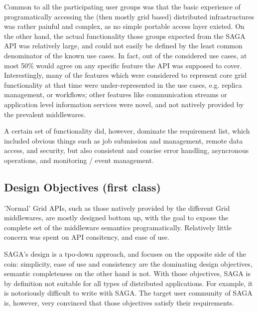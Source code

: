   Common to all the participating user groups was that the basic
  experience of programatically accessing the (then mostly grid based)
  distributed infrastructures was rather painful and complex, as no
  simple portable access layer existed.  On the other hand, the actual
  functionality those groups expected from the SAGA API was relatively
  large, and could not easily be defined by the least common
  denominator of the known use cases.  In fact, out of the considered
  use cases, at most 50\% would agree on any specific feature the API
  was supposed to cover.  Interestingly, many of the features which
  were considered to represent core grid functionality at that time
  were under-represented in the use cases, e.g. replica management, or
  workflows; other features like communication streams or application
  level information services were novel, and not natively provided by
  the prevalent middlewares.

  A certain set of functionality did, however, dominate the
  requirement list, which included obvious things such as job
  submission and management, remote data access, and security, but
  also consistent and concise error handling, asyncronous operations,
  and monitoring / event management.






 \subsection{Design Objectives (first class)}

  'Normal' Grid APIs, such as those natively provided by the different
  Grid middlewares, are mostly designed bottom up, with the goal to
  expose the complete set of the middleware semantics programatically.
  Relatively little concern was spent on API consitency, and ease of
  use.

  SAGA's design is a tpo-down approach, and focuses on the opposite
  side of the coin: simplicity, ease of use and consistency are the
  dominating design objectives, semantic completeness on the other
  hand is not.  With those objectives, SAGA is by definition not
  suitable for all types of distributed applications.  For example, it
  is notoriously difficult to write  with SAGA.  The
  target user community of SAGA is, however, very convinced that those
  objectives satisfy their requirements.

